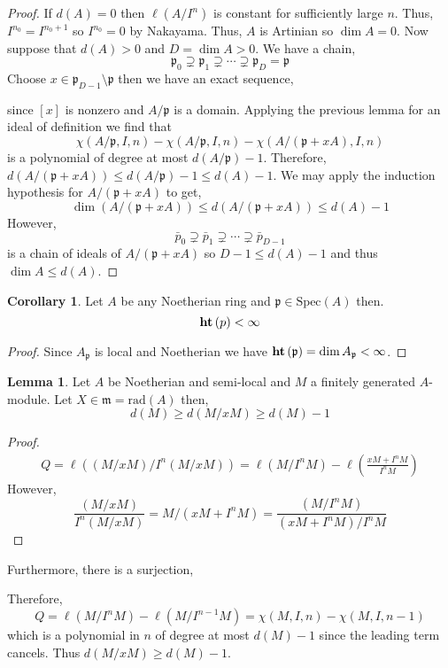\documentclass[12pt]{article}
\newcommand{\Spec}[1]{\mathrm{Spec}\left( #1 \right)}
\newcommand{\rad}[1]{\mathrm{rad}\left( #1 \right)}
\newcommand{\p}{\mathfrak{p}}
\newcommand{\m}{\mathfrak{m}}
\theoremstyle{remark}
\theoremstyle{definition}
\newtheorem{lemma}[theorem]{Lemma}
\newtheorem{corollary}[theorem]{Corollary}
\begin{document}
\begin{proof}
If $d(A) = 0$ then $\ell(A / I^n)$ is constant for sufficiently large $n$. Thus, $I^{n_0} = I^{n_0 + 1}$ so $I^{n_0} = 0$ by Nakayama. Thus, $A$ is Artinian so $\dim{A} = 0$. Now suppose that $d(A) > 0$ and $D = \dim{A} > 0$. We have a chain,
\[ \p_0 \supsetneq \p_1 \supsetneq \cdots \supsetneq \p_D = \p \]
Choose $x \in \p_{D - 1} \setminus \p$ then we have an exact sequence,
\begin{center}
\end{center}  
since $[x]$ is nonzero and $A / \p$ is a domain. Applying the previous lemma for an ideal of definition we find that
\[ \chi(A / \p, I, n) - \chi(A / \p, I, n) - \chi(A / (\p + x A), I, n) \]
is a polynomial of degree at most $d(A/\p) -1$. Therefore, $d(A/(\p + xA)) \le d(A/\p) - 1 \le d(A) - 1$. We may apply the induction hypothesis for $A/(\p + x A)$ to get,
\[ \dim(A / (\p + x A)) \le d(A / (\p + x A)) \le d(A)  - 1 \]
However,
\[ \bar{p}_0 \supsetneq \bar{p}_1 \supsetneq \cdots \supsetneq \bar{p}_{D-1} \]
is a chain of ideals of $A / (\p + x A)$ so $D - 1 \le d(A) - 1$ and thus $\dim{A} \le d(A)$. 
\end{proof}

\begin{corollary}
Let $A$ be any Noetherian ring and $\p \in \Spec{A}$ then.
\[ \mathbf{ht}\left( p \right) < \infty \]
\end{corollary}

\begin{proof}
Since $A_{\p}$ is local and Noetherian  we have $\height{\p} = \dim{A_{\p}} < \infty$. 
\end{proof}

\begin{lemma}
Let $A$ be Noetherian and semi-local and $M$ a finitely generated $A$-module. Let $X \in \m = \rad{A}$ then,
\[ d(M) \ge d(M/xM) \ge d(M) - 1 \]
\end{lemma}

\begin{proof}
\begin{align*}
Q = \ell\left( (M / x M) / I^n (M / xM) \right) = \ell(M / I^n M) - \ell\left( \frac{x M + I^n M}{I^n M} \right) 
\end{align*}
However, 
\[ \frac{(M / x M)}{ I^n (M / xM) } =  M / (x M + I^n M) = \frac{(M / I^n M)}{( x M + I^n M)/I^n M} \] 
\end{proof}
Furthermore, there is a surjection,
\begin{center}
\end{center}
Therefore,
\[ Q = \ell(M / I^n M) - \ell(M / I^{n-1} M) = \chi(M, I, n) - \chi(M, I, n - 1) \]
which is a polynomial in $n$ of degree at most $d(M) - 1$ since the leading term cancels. Thus $d(M / xM) \ge d(M) - 1$.
\end{document}
